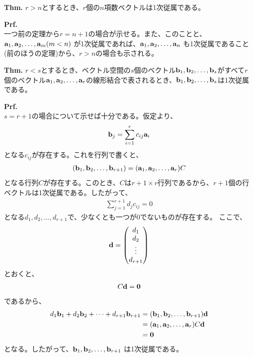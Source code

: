 \documentclass[a4paper,11pt]{jsarticle}
\numberwithin{equation}{section}
\begin{document}
\begin{itembox}[l]{\textbf{Thm.}}
  $r>n$とするとき、$r$個の$n$項数ベクトルは1次従属である。
\end{itembox}
\textbf{Prf.}\\
一つ前の定理から$r=n+1$の場合が示せる。また、このことと、$\vb{a}_1, \vb{a}_2, \dots, \vb{a}_m (m < n)$ が1次従属であれば、$\vb{a}_1, \vb{a}_2, \dots, \vb{a}_n$ も1次従属であること(前のほうの定理)から、$r>n$の場合も示される。\hfill\qedsymbol\\

\begin{itembox}[l]{\textbf{Thm.}}
  $r<s$とするとき、ベクトル空間の$s$個のベクトル$\vb{b}_1, \vb{b}_2, \dots, \vb{b}_s$がすべて$r$個のベクトル$\vb{a}_1, \vb{a}_2, \dots, \vb{a}_r$の線形結合で表されるとき、$\vb{b}_1, \vb{b}_2, \dots, \vb{b}_s$は1次従属である。
\end{itembox}
\textbf{Prf.}\\
$s=r+1$の場合について示せば十分である。仮定より、
\begin{align}
  \vb{b}_j = \sum_{i=1}^{r} c_{ij}\vb{a}_i
\end{align}
となる$c_{ij}$が存在する。これを行列で書くと、
\begin{align}
  (\vb{b}_1, \vb{b}_2, \dots, \vb{b}_{r+1}) = (\vb{a}_1, \vb{a}_2, \dots, \vb{a}_r)C
\end{align}
となる行列$C$が存在する。このとき、$C$は$r+1 \times r$行列であるから、$r+1$個の行ベクトルは1次従属である。したがって、
\begin{align}
  \sum_{j=1}^{r+1} d_jc_{ij} = 0
\end{align}
となる$d_1, d_2, \dots, d_{r+1}$で、少なくとも一つが0でないものが存在する。
ここで、
\begin{align}
  \vb{d} = 
  \begin{pmatrix}
    d_1\\
    d_2\\
    \vdots\\
    d_{r+1}
  \end{pmatrix}
\end{align}
とおくと、
\begin{align}
  C\vb{d} = \vb{0}
\end{align}
であるから、
\begin{align}
  d_1\vb{b}_1 + d_2\vb{b}_2 + \dots + d_{r+1}\vb{b}_{r+1} &=
  (\vb{b}_1, \vb{b}_2, \dots, \vb{b}_{r+1})\vb{d}\\
  &= (\vb{a}_1, \vb{a}_2, \dots, \vb{a}_r)C\vb{d}\\
  &= \vb{0}
\end{align}
となる。したがって、$\vb{b}_1, \vb{b}_2, \dots, \vb{b}_{r+1}$ は1次従属である。\hfill\qedsymbol\\
\end{document}
